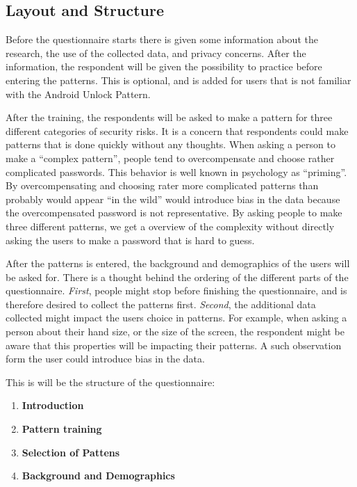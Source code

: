  \clearpage
  \subsection{Layout and Structure}\label{sec:layout}

    Before the questionnaire starts there is given some information about the research, the use of the collected data, and privacy concerns. After the information, the respondent will be given the possibility to practice before entering the patterns. This is optional, and is added for users that is not familiar with the Android Unlock Pattern.

    After the training, the respondents will be asked to make a pattern for three different categories of security risks. It is a concern that respondents could make patterns that is done quickly without any thoughts. When asking a person to make a ``complex pattern'', people tend to overcompensate and choose rather complicated passwords. This behavior is well known in psychology as ``priming''. By overcompensating and choosing rater more complicated patterns than probably would appear ``in the wild'' would introduce bias in the data because the overcompensated password is not representative. By asking people to make three different patterns, we get a overview of the complexity without directly asking the users to make a password that is hard to guess.

    After the patterns is entered, the background and demographics of the users will be asked for. There is a thought behind the ordering of the different parts of the questionnaire. {\it First}, people might stop before finishing the questionnaire, and is therefore desired to collect the patterns first. {\it Second}, the additional data collected might impact the users choice in patterns. For example, when asking a person about their hand size, or the size of the screen, the respondent might be aware that this properties will be impacting their patterns. A such observation form the user could introduce bias in the data.

    This is will be the structure of the questionnaire:

    \begin{enumerate}
      \item {\bf Introduction}
      \item {\bf Pattern training}
      \item {\bf Selection of Pattens}
      \item {\bf Background and Demographics}
    \end{enumerate}

